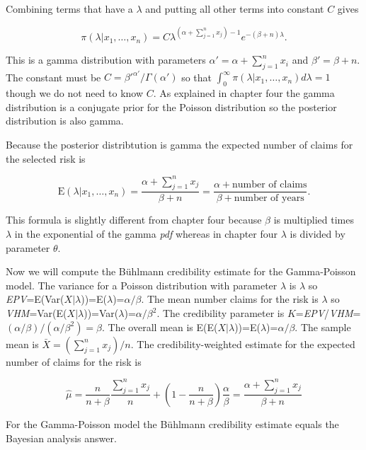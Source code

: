 \documentclass[]{book}
\theoremstyle{definition}
\theoremstyle{definition}
\theoremstyle{definition}
\theoremstyle{remark}
\begin{document}
\noindent Combining terms that have a \(\lambda\) and putting all other
terms into constant \(C\) gives

\begin{equation*} 
\pi(\lambda|x_1,\ldots,x_n)=C\lambda^{(\alpha+\sum_{j=1}^{n}x_j)-1}e^{-(\beta+n)\lambda}. 
\end{equation*}

This is a gamma distribution with parameters
\(\alpha'=\alpha+\sum_{j=1}^{n}x_i\) and \(\beta'=\beta+n\). The
constant must be \(C={\beta'}^{\alpha'}/\Gamma(\alpha')\) so that
\(\int_{0}^{\infty}\pi(\lambda|x_1,\ldots,x_n) d\lambda=1\) though we do
not need to know \(C\). As explained in chapter four the gamma
distribution is a conjugate prior for the Poisson distribution so the
posterior distribution is also gamma.

Because the posterior distribtution is gamma the expected number of
claims for the selected risk is

\begin{equation*}  
\mathrm{E}(\lambda|x_1,\ldots,x_n) = \frac{\alpha+\sum_{j=1}^{n}x_j}{\beta+n}=\frac{\alpha + \textrm{number of claims}}{\beta+\textrm{number of years}}. 
\end{equation*}

This formula is slightly different from chapter four because \(\beta\)
is multiplied times \(\lambda\) in the exponential of the gamma
\emph{pdf} whereas in chapter four \(\lambda\) is divided by parameter
\(\theta\).

Now we will compute the Bühlmann credibility estimate for the
Gamma-Poisson model. The variance for a Poisson distribution with
parameter \(\lambda\) is \(\lambda\) so
\emph{EPV}=E(Var(\(X|\lambda\)))=E(\(\lambda\))=\(\alpha/\beta\). The
mean number claims for the risk is \(\lambda\) so
\emph{VHM}=Var(E(\(X|\lambda\)))=Var(\(\lambda\))=\(\alpha/\beta^2\).
The credibility parameter is
\(K\)=\emph{EPV}/\emph{VHM}=\((\alpha/\beta)/(\alpha/\beta^2)=\beta\).
The overall mean is E(E(\(X|\lambda\)))=E(\(\lambda\))=\(\alpha/\beta\).
The sample mean is \(\bar{X}=(\sum_{j=1}^{n}x_j)/n\). The
credibility-weighted estimate for the expected number of claims for the
risk is

\begin{equation*} 
\hat{\mu}=\frac{n}{n+\beta}\frac{\sum_{j=1}^{n}x_j}{n} +(1-\frac{n}{n+\beta})\frac{\alpha}{\beta}=\frac{\alpha+\sum_{j=1}^{n}x_j}{\beta+n} 
\end{equation*}

For the Gamma-Poisson model the Bühlmann credibility estimate equals the
Bayesian analysis answer.
\end{document}
